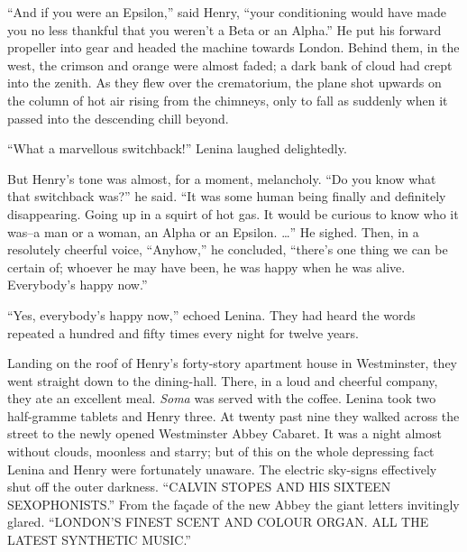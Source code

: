 \documentclass[12pt]{report}
\begin{document}
``And if you were an Epsilon,'' said Henry, ``your conditioning would
have made you no less thankful that you weren't a Beta or an Alpha.'' He
put his forward propeller into gear and headed the machine towards
London. Behind them, in the west, the crimson and orange were almost
faded; a dark bank of cloud had crept into the zenith. As they flew over
the crematorium, the plane shot upwards on the column of hot air rising
from the chimneys, only to fall as suddenly when it passed into the
descending chill beyond.

``What a marvellous switchback!'' Lenina laughed delightedly.

But Henry's tone was almost, for a moment, melancholy. ``Do you know
what that switchback was?'' he said. ``It was some human being finally
and definitely disappearing. Going up in a squirt of hot gas. It would
be curious to know who it was--a man or a woman, an Alpha or an Epsilon.
\ldots{}'' He sighed. Then, in a resolutely cheerful voice, ``Anyhow,''
he concluded, ``there's one thing we can be certain of; whoever he may
have been, he was happy when he was alive. Everybody's happy now.''

``Yes, everybody's happy now,'' echoed Lenina. They had heard the words
repeated a hundred and fifty times every night for twelve years.

Landing on the roof of Henry's forty-story apartment house in
Westminster, they went straight down to the dining-hall. There, in a
loud and cheerful company, they ate an excellent meal. \emph{Soma} was
served with the coffee. Lenina took two half-gramme tablets and Henry
three. At twenty past nine they walked across the street to the newly
opened Westminster Abbey Cabaret. It was a night almost without clouds,
moonless and starry; but of this on the whole depressing fact Lenina and
Henry were fortunately unaware. The electric sky-signs effectively shut
off the outer darkness. ``CALVIN STOPES AND HIS SIXTEEN SEXOPHONISTS.''
From the façade of the new Abbey the giant letters invitingly glared.
``LONDON'S FINEST SCENT AND COLOUR ORGAN. ALL THE LATEST SYNTHETIC
MUSIC.''
\end{document}
